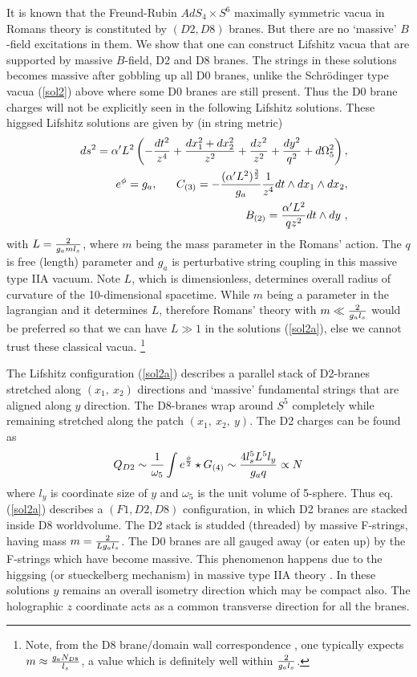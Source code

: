 \documentclass[12pt]{article}
\def\be{\begin{equation}} \def\ee{\end{equation}}
\def\bea{\begin{eqnarray}} \def\eea{\end{eqnarray}} \def\ba{\begin{array}}
\newcommand{\eqn}[1]{(\ref{#1})}
\def\br{\nonumber\\}
\begin{document}
It is  known that the
 Freund-Rubin  $AdS_4\times S^6$ maximally symmetric
vacua in Romans theory \cite{roma} 
is constituted by $(D2,D8)$ branes. But there are no `massive'  
$B$-field excitations in them.    
We  show  that one can  construct  Lifshitz   vacua 
that are  supported by  massive $B$-field, D2 and D8 branes.
The strings in these solutions becomes massive after gobbling up all 
D0 branes, unlike the Schr\"odinger type vacua \eqn{sol2} above 
where some D0 branes are still present. 
Thus the D0 brane charges  will not be  explicitly seen 
in the following Lifshitz solutions.
These higgsed Lifshitz solutions are given by (in string  metric) 
\bea\label{sol2a}
&&ds^2=\alpha' L^2\left(- {dt^2\over  z^4} +{dx_1^2+dx_2^2\over z^2}+{dz^2\over
z^2}  +{dy^2\over  q^2} + d\Omega_5^2 \right) ,\br
&&e^\phi=g_a, ~~~~~C_{(3)}= -{(\alpha' L^2)^{3\over 2} \over g_a}
{1\over  z^4}dt\wedge dx_1\wedge dx_2, \br &&
B_{(2)}=  {\alpha' L^2\over q z^2}dt\wedge dy  \ ,
\eea 
with  $L={2\over g_a  m l_s}$, where $m$ being the mass 
parameter in the Romans' action. The $q$ 
is  free (length)  parameter 
and $g_a$ is  perturbative string coupling in this  massive type IIA vacuum. 
Note $L$, which is dimensionless,
determines overall radius of curvature of the 10-dimensional spacetime.
While $m$ being a parameter in the lagrangian and it determines 
 $L$,  therefore Romans' theory with 
  $m \ll{ 2\over g_a l_s}$ would be preferred 
so that we can have $L\gg 1$ in  the solutions \eqn{sol2a}, else
  we cannot trust these classical vacua. \footnote{Note, from  the D8
brane/domain wall correspondence \cite{berg}, one typically
expects $m \approx {g_a N_{D8} \over l_s}$, a value which is definitely
well within ${ 2\over g_a l_s}$.}


The Lifshitz configuration \eqn{sol2a} describes a parallel stack 
of D2-branes stretched along $(x_1,~x_2)$
directions and `massive' fundamental strings that are aligned
along  $y$ direction. The D8-branes  wrap around $S^5$ 
completely while remaining stretched along the  patch $(x_1,~x_2,~y)$. 
The  D2 charges can be found as
\be
\label{d2q}
Q_{D2}\sim{1\over\omega_5}
\int e^{\phi\over 2} \star G_{(4)}
\sim {4l_s^5 L^5 l_y\over g_a q}  \propto  N 
\ee
where $l_y$ is coordinate size of $y$  and $\omega_5$ is the unit
 volume of  5-sphere. 
Thus eq.\eqn{sol2a} describes a  $(F1,D2,D8)$ configuration, in which
D2 branes are  stacked inside D8 worldvolume. The D2 stack is studded (threaded)
by massive F-strings, having mass  $m={2\over L g_a  l_s}$. The D0 branes 
are all gauged away (or eaten up) by the F-strings which  have become  massive.
This phenomenon  happens due to  the higgsing  (or stueckelberg mechanism) 
 in massive type IIA theory \cite{roma}.    
In these solutions $y$ remains an overall isometry direction which 
may be  compact also. The holographic
$z$ coordinate  acts as a common
transverse direction for all the branes. 
\end{document}
